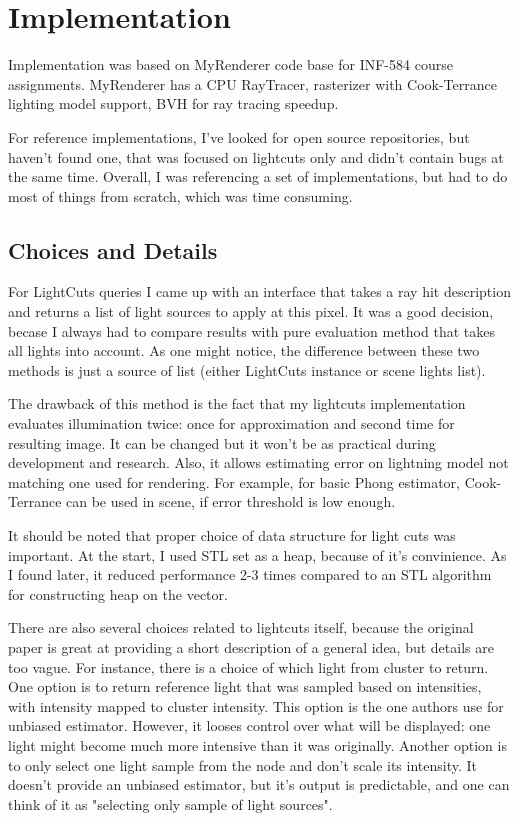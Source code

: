 \documentclass[twocolumn]{article}
\begin{document}
\section{Implementation}

Implementation was based on MyRenderer code base for INF-584 course assignments.
MyRenderer has a CPU RayTracer, rasterizer with Cook-Terrance lighting model support, BVH for ray tracing speedup. 

For reference implementations, I've looked for open source repositories, but haven't found one, that was focused on lightcuts only and didn't contain bugs at the same time.
Overall, I was referencing a set of implementations, but had to do most of things from scratch, which was time consuming.

\subsection{Choices and Details}

For LightCuts queries I came up with an interface that takes a ray hit description and returns a list of light sources to apply at this pixel.
It was a good decision, becase I always had to compare results with pure evaluation method that takes all lights into account.
As one might notice, the difference between these two methods is just a source of list (either LightCuts instance or scene lights list).

The drawback of this method is the fact that my lightcuts implementation evaluates illumination twice: once for approximation and second time for resulting image.
It can be changed but it won't be as practical during development and research.
Also, it allows estimating error on lightning model not matching one used for rendering.
For example, for basic Phong estimator, Cook-Terrance can be used in scene, if error threshold is low enough.

It should be noted that proper choice of data structure for light cuts was important.
At the start, I used STL set as a heap, because of it's convinience.
As I found later, it reduced performance 2-3 times compared to an STL algorithm for constructing heap on the vector.

There are also several choices related to lightcuts itself, because the original paper is great at providing a short description of a general idea, but details are too vague.
For instance, there is a choice of which light from cluster to return.
One option is to return reference light that was sampled based on intensities, with intensity mapped to cluster intensity.
This option is the one authors use for unbiased estimator.
However, it looses control over what will be displayed: one light might become much more intensive than it was originally.
Another option is to only select one light sample from the node and don't scale its intensity.
It doesn't provide an unbiased estimator, but it's output is predictable, and one can think of it as "selecting only sample of light sources".
\end{document}
